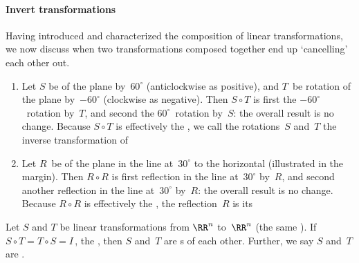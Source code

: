 \paragraph{Invert transformations}
Having introduced and characterized the composition of linear transformations, we now discuss when two transformations composed together end up `cancelling' each other out.

\begin{example} 
\begin{enumerate}
\item Let \(S\) be  of the plane by~\(60^\circ\) (anticlockwise as positive), and \(T\)~be rotation of the plane by~\(-60^\circ\) (clockwise as negative).
Then \(S\circ T\) is first the \(-60^\circ\)~rotation by~\(T\), and second the \(60^\circ\)~rotation by~\(S\): the overall result is no change.
Because \(S\circ T\) is effectively the , we call the rotations~\(S\) and~\(T\) the inverse transformation of 

\item Let \(R\)~be  of the plane in the line at~\(30^\circ\) to the horizontal (illustrated in the margin).  
%
Then \(R\circ R\) is first reflection in the line at~\(30^\circ\) by~\(R\), and second another reflection in the line at~\(30^\circ\) by~\(R\): the overall result is no change.
Because \(R\circ R\) is effectively the , the reflection~\(R\) is its 
\end{enumerate}
\end{example}



\begin{definition} \label{def:invLT} 
Let \(S\) and \(T\) be linear transformations from \(\RR^n\) to~\(\RR^n\) (the same ).
If \(S\circ T=T\circ S=I\)\,, the , then \(S\) and~\(T\) are s of each other.  
Further, we say \(S\) and~\(T\) are .
\end{definition}



